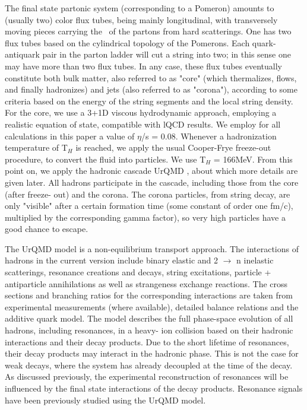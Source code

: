 The final state partonic system (corresponding to a Pomeron) amounts to (usually two) color flux tubes, being mainly longitudinal, with transversely moving pieces carrying the \pt~of the partons from hard scatterings. One has two flux tubes based on the cylindrical topology of the Pomerons. Each quark- antiquark pair in the parton ladder will cut a string into two; in this sense one may have more than two flux tubes. In any case, these flux tubes eventually constitute both bulk matter, also referred to as "core" (which thermalizes, flows, and finally hadronizes) and jets (also referred to as "corona"), according to some criteria based on the energy of the string segments and the local string density. For the core, we use a 3+1D viscous hydrodynamic approach, employing a realistic equation of state, compatible with lQCD results. We employ for all calculations in this paper a value of $\eta$/s = 0.08. Whenever a hadronization temperature of T$_{H}$ is reached, we apply the usual Cooper-Frye freeze-out procedure, to convert the fluid into particles. We use T$_{H}$ = 166MeV. From this point on, we apply the hadronic cascade UrQMD \cite{cite:URQMDa, cite:URQMDb}, about which more details are given later. All hadrons participate in the cascade, including those from the core (after freeze- out) and the corona. The corona particles, from string decay, are only "visible" after a certain formation time (some constant of order one fm/c), multiplied by the corresponding gamma factor), so very high \pt particles have a good chance to escape.

The UrQMD model is a non-equilibrium transport approach. The interactions of hadrons in the current version include binary elastic and 2 $\rightarrow$ n inelastic scatterings, resonance creations and decays, string excitations, particle + antiparticle annihilations as well as strangeness exchange reactions. The cross sections and branching ratios for the corresponding interactions are taken from experimental measurements (where available), detailed balance relations and the additive quark model. The model describes the full phase-space evolution of all hadrons, including resonances, in a heavy- ion collision based on their hadronic interactions and their decay products. Due to the short lifetime of resonances, their decay products may interact in the hadronic phase. This is not the case for weak decays, where the system has already decoupled at the time of the decay. As discussed previously, the experimental reconstruction of resonances will be influenced by the final state interactions of the decay products. Resonance signals have been previously studied using the UrQMD model. 


\newpage